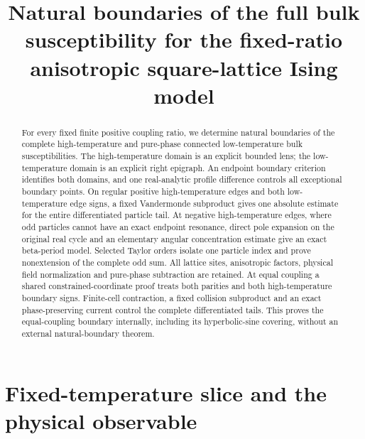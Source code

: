 \documentclass[11pt]{article}
\title{Natural boundaries of the full bulk susceptibility\newline
for the fixed-ratio anisotropic square-lattice Ising model}
\author{}
\date{}
\numberwithin{equation}{section}
\theoremstyle{definition}
\begin{document}
\maketitle
\begin{abstract}
For every fixed finite positive coupling ratio, we determine natural
boundaries of the complete high-temperature and pure-phase connected
low-temperature bulk susceptibilities. The high-temperature domain is
an explicit bounded lens; the low-temperature domain is an explicit
right epigraph. An endpoint boundary criterion identifies both domains,
and one real-analytic profile difference controls all exceptional
boundary points. On regular positive high-temperature edges and both
low-temperature edge signs, a fixed Vandermonde subproduct gives one
absolute estimate for the entire differentiated particle tail.
At negative high-temperature edges, where odd particles cannot have an
exact endpoint resonance, direct pole expansion on the original real
cycle and an elementary angular concentration estimate give an exact
beta-period model. Selected Taylor orders isolate one particle index
and prove nonextension of the complete odd sum. All lattice sites,
anisotropic factors, physical field normalization and pure-phase
subtraction are retained. At equal coupling a shared constrained-coordinate
proof treats both parities and both high-temperature boundary signs.
Finite-cell contraction, a fixed collision subproduct and an exact
phase-preserving current control the complete differentiated tails.
This proves the equal-coupling boundary internally, including its
hyperbolic-sine covering, without an external natural-boundary theorem.
\end{abstract}
\tableofcontents

\section{Fixed-temperature slice and the physical observable}\label{sec:physical}
\end{document}
